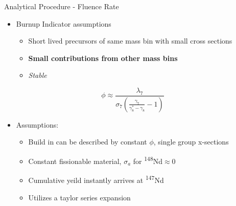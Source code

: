 \documentclass{beamer}
\newcommand{\tss}{\textsuperscript}
\begin{document}
\begin{frame}{Analytical Procedure - Fluence Rate}
  \begin{itemize}
  \item{Burnup Indicator assumptions}
    \begin{itemize}
    \item{Short lived precursors of same mass bin with small cross sections}
    \item{\textbf{Small contributions from other mass bins}}
    \item{\textit{Stable}}
    \end{itemize}
  \end{itemize}
  \begin{equation*}
    \phi\approx\frac{\lambda_7}{\sigma_7\left(\frac{\gamma_7}{\gamma_8^*-\gamma_8}-1\right)}
  \end{equation*}
  \begin{itemize}
  \item{Assumptions:}
    \begin{itemize}
    \item{Build in can be described by constant $\phi$, single group x-sections}
    \item{Constant fissionable material, $\sigma_a$ for \tss{148}Nd$\approx0$}
    \item{Cumulative yeild instantly arrives at \tss{147}Nd}
    \item{Utilizes a taylor series expansion}
    \end{itemize}
  \end{itemize}
\end{frame}
\end{document}
